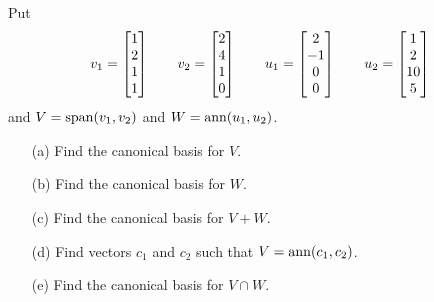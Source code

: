 \documentclass[a4paper]{article}
\begin{document}
\begin{problem}[2011-12 resit]
 Put 
 \[ v_1 = \left[\begin{matrix}  1\\  2\\  1\\ 1 \end{matrix}\right] \hspace{2em}
    v_2 = \left[\begin{matrix}  2\\  4\\  1\\ 0 \end{matrix}\right] \hspace{2em}
    u_1 = \left[\begin{matrix}  2\\ -1\\  0\\ 0 \end{matrix}\right] \hspace{2em}
    u_2 = \left[\begin{matrix}  1\\  2\\ 10\\ 5 \end{matrix}\right]
 \]
 and $V=\operatorname{span}(v_1,v_2)$ and $W=\operatorname{ann}(u_1,u_2)$.  
 \begin{itemize}
  \item[(a)] Find the canonical basis for $V$. 
  \item[(b)] Find the canonical basis for $W$. 
  \item[(c)] Find the canonical basis for $V+W$. 
  \item[(d)] Find vectors $c_1$ and $c_2$ such that
   $V=\operatorname{ann}(c_1,c_2)$. 
  \item[(e)] Find the canonical basis for $V\cap W$. 
 \end{itemize}
\end{problem}
\end{document}
